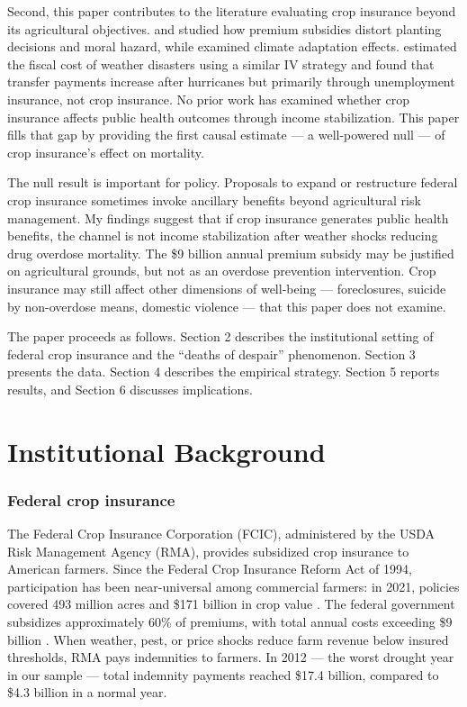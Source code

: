 \documentclass[12pt]{article}
\begin{document}
Second, this paper contributes to the literature evaluating crop insurance beyond its agricultural objectives. \citet{goodwin2004premium} and \citet{yu2018crop} studied how premium subsidies distort planting decisions and moral hazard, while \citet{annan2015federal} examined climate adaptation effects. \citet{deryugina2017economic} estimated the fiscal cost of weather disasters using a similar IV strategy and found that transfer payments increase after hurricanes but primarily through unemployment insurance, not crop insurance. No prior work has examined whether crop insurance affects public health outcomes through income stabilization. This paper fills that gap by providing the first causal estimate --- a well-powered null --- of crop insurance's effect on mortality.

The null result is important for policy. Proposals to expand or restructure federal crop insurance sometimes invoke ancillary benefits beyond agricultural risk management. My findings suggest that if crop insurance generates public health benefits, the channel is not income stabilization after weather shocks reducing drug overdose mortality. The \$9 billion annual premium subsidy may be justified on agricultural grounds, but not as an overdose prevention intervention. Crop insurance may still affect other dimensions of well-being --- foreclosures, suicide by non-overdose means, domestic violence --- that this paper does not examine.

The paper proceeds as follows. Section 2 describes the institutional setting of federal crop insurance and the ``deaths of despair'' phenomenon. Section 3 presents the data. Section 4 describes the empirical strategy. Section 5 reports results, and Section 6 discusses implications.

\section{Institutional Background}

\subsubsection*{Federal crop insurance} The Federal Crop Insurance Corporation (FCIC), administered by the USDA Risk Management Agency (RMA), provides subsidized crop insurance to American farmers. Since the Federal Crop Insurance Reform Act of 1994, participation has been near-universal among commercial farmers: in 2021, policies covered 493 million acres and \$171 billion in crop value \citep{glauber2013growth}. The federal government subsidizes approximately 60\% of premiums, with total annual costs exceeding \$9 billion \citep{babcock2013crop}. When weather, pest, or price shocks reduce farm revenue below insured thresholds, RMA pays indemnities to farmers. In 2012 --- the worst drought year in our sample --- total indemnity payments reached \$17.4 billion, compared to \$4.3 billion in a normal year.
\end{document}
